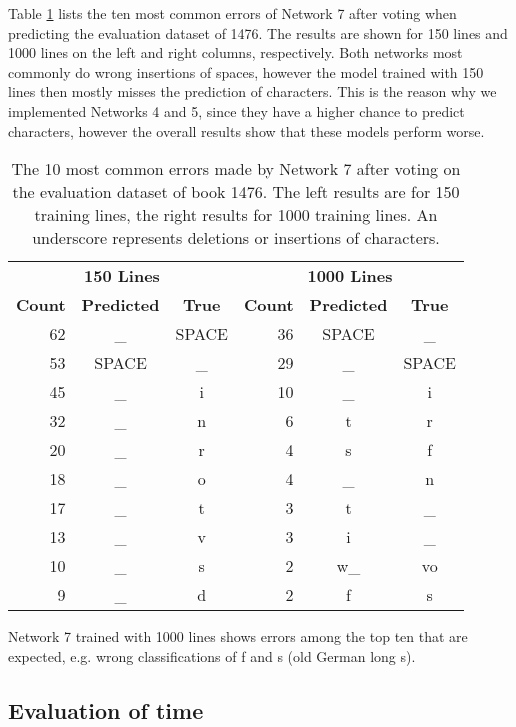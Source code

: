 \documentclass{jlcl}
\def\longs{{\fontencoding{TS1}\selectfont s}}
\begin{document}
Table \ref{tab:confusion_errors} lists the ten most common errors of Network 7 after voting when predicting the evaluation dataset of 1476.
The results are shown for 150 lines and 1000 lines on the left and right columns, respectively.
Both networks most commonly do wrong insertions of spaces, however the model trained with 150 lines then mostly misses the prediction of characters.
This is the reason why we implemented Networks 4 and 5, since they have a higher chance to predict characters, however the overall results show that these models perform worse.
%
\begin{table}[t]
    \centering
    \caption{The 10 most common errors made by Network 7 after voting on the evaluation dataset of book 1476. The left results are for 150 training lines, the right results for 1000 training lines. An underscore represents deletions or insertions of characters.}
    \label{tab:confusion_errors}
    \begin{tabular}{r|cc||r|cc}
        \hline
        \multicolumn{3}{c||}{\textbf{150 Lines}} & \multicolumn{3}{c}{\textbf{1000 Lines}} \\
        \textbf{Count} & \textbf{Predicted} & \textbf{True} & \textbf{Count} & \textbf{Predicted} & \textbf{True} \\
        \hline
        62 & \_ & SPACE & 36 & SPACE & \_ \\
        53 & SPACE & \_ & 29 & \_ & SPACE \\
        45 & \_ & i &     10 & \_ & i \\
        32 & \_ & n &      6 & t & r \\
        20 & \_ & r &      4 & \longs & f\\
        18 & \_ & o &      4 & \_ & n \\
        17 & \_ & t &      3 & t & \_ \\
        13 & \_ & v &      3 & i & \_ \\
        10 & \_ & s &      2 & w\_ & vo \\
         9 & \_ & d &      2 & f & \longs \\
        \hline
    \end{tabular}
\end{table}
%
Network 7 trained with 1000 lines shows errors among the top ten that are expected, e.g. wrong classifications of f and \longs{} (old German long s).

\subsection{Evaluation of time}
\end{document}
